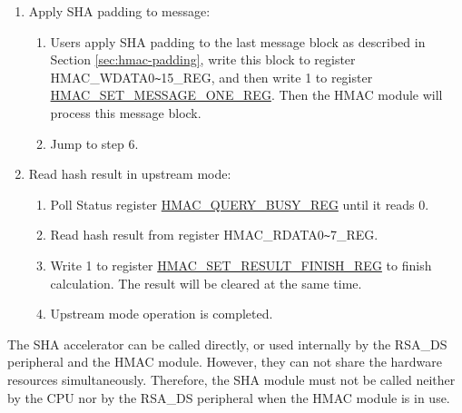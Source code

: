 \documentclass[main\_\_EN.tex]{subfiles}
\begin{document}
\begin{enumerate}
\begin{enumerate}
\begin{itemize}
\begin{enumerate}
                \item If Block\_\textcolor{red}{n} is the second last padded block, write 1 to register\\ \hyperref[regdesc:HMACSETMESSAGEPADREG]{HMAC\_SET\_MESSAGE\_PAD\_REG}, and then jump to step 5.
                \item If Block\_\textcolor{red}{n} is neither the last nor the second last message block, write 1 to register \\\hyperref[regdesc:HMACSETMESSAGEINGREG]{HMAC\_SET\_MESSAGE\_ING\_REG} and define $n=n+1$, and then jump to step 4.(b).
            \end{enumerate}
        \end{itemize}
    \end{enumerate}

    \item Apply SHA padding to message:
    \begin{enumerate}
        \item Users apply SHA padding to the last message block as described in Section \ref{sec:hmac-padding}, write this block to register HMAC\_WDATA0\verb+~+15\_REG, and then write 1 to register \hyperref[regdesc:HMACSETMESSAGEONEREG]{HMAC\_SET\_MESSAGE\_ONE\_REG}. Then the HMAC module will process this message block.
        \item Jump to step 6.
    \end{enumerate}

    \item Read hash result in upstream mode:
    \begin{enumerate}
        \item Poll Status register \hyperref[regdesc:HMACQUERYBUSYREG]{HMAC\_QUERY\_BUSY\_REG} until it reads 0.
        \item Read hash result from register HMAC\_RDATA0\verb+~+7\_REG.
        \item Write 1 to register \hyperref[regdesc:HMACSETRESULTFINISHREG]{HMAC\_SET\_RESULT\_FINISH\_REG} to finish calculation. The result will be cleared at the same time.
        \item Upstream mode operation is completed.
    \end{enumerate}

\end{enumerate}

\begin{tiplisting}
    The SHA accelerator can be called directly, or used internally by the RSA\_DS peripheral and the HMAC module. However, they can not share the hardware resources simultaneously. Therefore, the SHA module must not be called neither by the CPU nor by the RSA\_DS peripheral when the HMAC module is in use.
\end{tiplisting}
\end{document}
